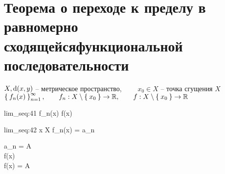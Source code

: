 \section{Теорема о переходе к пределу в равномерно сходящейся\n функциональной последовательности}

\begin{theorem}
	$ X, \operatorname{d}(x, y) $ -- метрическое пространство, $ \qquad x_0 \in X $ -- точка сгущения $ X $ \\
	$ \Set{f_n(x)}_{n=1}^{\infty}, \qquad f_n : X \setminus \Set{x_0} \to \mathbb{R}, \qquad f : X \setminus \Set{x_0} \to \mathbb{R} $
	\begin{equ}{lim_seq:41}
		f_n(x)  f(x)
	\end{equ}
	\begin{equ}{lim_seq:42}
		\forall x \in X \setminus {} \quad \exist {} f_n(x) = a_n
	\end{equ}
	\begin{mequ}[\implies \empheqlbrace]
		 \exist {} a_n = A \in \R \\
		 \exist {} f(x) \\
		  f(x) = A
	\end{mequ}
\end{theorem}

